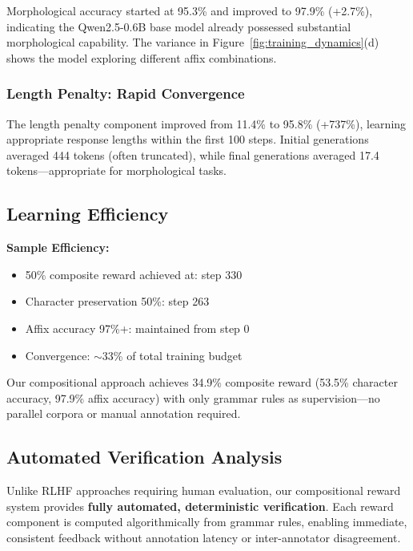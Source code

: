 \documentclass{article}
\begin{document}
Morphological accuracy started at 95.3\% and improved to 97.9\% (+2.7\%), indicating the Qwen2.5-0.6B base model already possessed substantial morphological capability. The variance in Figure~\ref{fig:training_dynamics}(d) shows the model exploring different affix combinations.

\subsubsection{Length Penalty: Rapid Convergence}

The length penalty component improved from 11.4\% to 95.8\% (+737\%), learning appropriate response lengths within the first 100 steps. Initial generations averaged 444 tokens (often truncated), while final generations averaged 17.4 tokens---appropriate for morphological tasks.

\subsection{Learning Efficiency}

\textbf{Sample Efficiency:}
\begin{itemize}
    \item 50\% composite reward achieved at: step 330
    \item Character preservation 50\%: step 263
    \item Affix accuracy 97\%+: maintained from step 0
    \item Convergence: $\sim$33\% of total training budget
\end{itemize}

Our compositional approach achieves 34.9\% composite reward (53.5\% character accuracy, 97.9\% affix accuracy) with only grammar rules as supervision---no parallel corpora or manual annotation required.

\subsection{Automated Verification Analysis}

Unlike RLHF approaches requiring human evaluation, our compositional reward system provides \textbf{fully automated, deterministic verification}. Each reward component is computed algorithmically from grammar rules, enabling immediate, consistent feedback without annotation latency or inter-annotator disagreement.
\end{document}
